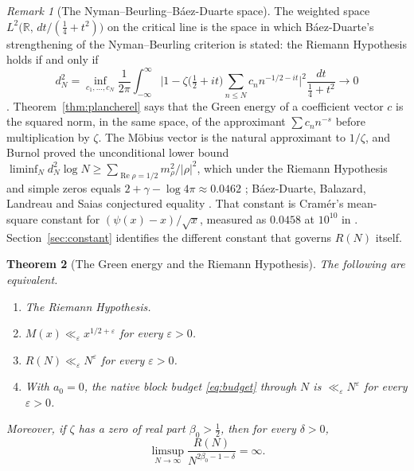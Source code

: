 \documentclass[11pt]{article}
\newtheorem{theorem}{Theorem}[section]
\theoremstyle{definition}
\theoremstyle{remark}
\newtheorem{remark}[theorem]{Remark}
\newcommand{\R}{\mathbb{R}}
\DeclareMathOperator{\Ree}{Re}
\begin{document}
\begin{remark}[The Nyman--Beurling--B\'aez-Duarte space]\label{rem:nb}
The weighted space $L^2\big(\R,\,dt/(\frac14+t^2)\big)$ on the critical line is the space in which B\'aez-Duarte's strengthening of the Nyman--Beurling criterion is stated: the Riemann Hypothesis holds if and only if
\[
d_N^2=\inf_{c_1,\dots,c_N}\frac1{2\pi}\int_{-\infty}^\infty\Big|1-\zeta\big(\tfrac12+it\big)\sum_{n\le N}c_n n^{-1/2-it}\Big|^2\frac{dt}{\frac14+t^2}\longrightarrow0
\]
\cite{baezduarte}. Theorem~\ref{thm:plancherel} says that the Green energy of a coefficient vector $c$ is the squared norm, in the same space, of the approximant $\sum c_n n^{-s}$ before multiplication by $\zeta$. The M\"obius vector is the natural approximant to $1/\zeta$, and Burnol proved the unconditional lower bound $\liminf_N d_N^2\log N\ge\sum_{\Ree\rho=1/2}m_\rho^2/|\rho|^2$, which under the Riemann Hypothesis and simple zeros equals $2+\gamma-\log4\pi\approx0.0462$ \cite{burnol}; B\'aez-Duarte, Balazard, Landreau and Saias conjectured equality \cite{bbls}. That constant is Cram\'er's mean-square constant for $(\psi(x)-x)/\sqrt x$, measured as $0.0458$ at $10^{10}$ in \cite[Computation 13.3]{michaels-folds}. Section~\ref{sec:constant} identifies the different constant that governs $R(N)$ itself.
\end{remark}

\begin{theorem}[The Green energy and the Riemann Hypothesis]\label{thm:rhcrit}
The following are equivalent.
\begin{enumerate}[label=(\roman*)]
\item The Riemann Hypothesis.
\item $M(x)\ll_\varepsilon x^{1/2+\varepsilon}$ for every $\varepsilon>0$.
\item $R(N)\ll_\varepsilon N^{\varepsilon}$ for every $\varepsilon>0$.
\item With $a_0=0$, the native block budget \eqref{eq:budget} through $N$ is $\ll_\varepsilon N^\varepsilon$ for every $\varepsilon>0$.
\end{enumerate}
Moreover, if $\zeta$ has a zero of real part $\beta_0>\frac12$, then for every $\delta>0$,
\begin{equation}\label{eq:offline}
\limsup_{N\to\infty}\frac{R(N)}{N^{2\beta_0-1-\delta}}=\infty.
\end{equation}
\end{theorem}
\end{document}
